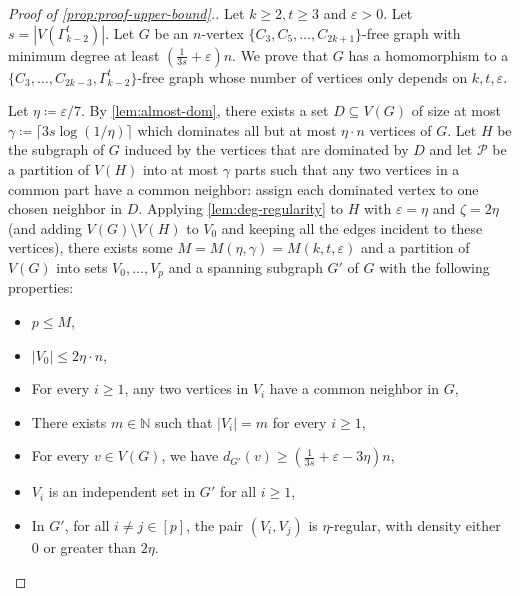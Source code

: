 \documentclass{article}
\begin{document}
\begin{proof}[Proof of \cref{prop:proof-upper-bound}.]
    Let $k \geq 2, t \geq 3$ and $\varepsilon > 0$.
    Let $s = |V(\Gamma_{k-2}^t)|$.
    Let $G$ be an $n$-vertex $\{C_3, C_5, \ldots, C_{2k+1}\}$-free graph with minimum degree at least $\left(\frac{1}{3s}+\varepsilon\right)n$.
    We prove that $G$ has a homomorphism to a $\{C_3, \ldots, C_{2k-3}, \Gamma_{k-2}^t\}$-free graph whose number of vertices only depends on $k, t, \varepsilon$.
    
    Let $\eta \coloneqq \varepsilon/7$.
    By \cref{lem:almost-dom}, there exists a set $D \subseteq V(G)$ of size at most $\gamma \coloneqq \lceil3s\log(1/\eta)\rceil$ which dominates all but at most $\eta \cdot n$ vertices of $G$.
    Let $H$ be the subgraph of $G$ induced by the vertices that are dominated by $D$ and let $\mathcal{P}$ be a partition of $V(H)$ into at most $\gamma$ parts such that any two vertices in a common part have a common neighbor: assign each dominated vertex to one chosen neighbor in $D$.
    Applying \cref{lem:deg-regularity} to $H$ with $\varepsilon = \eta$ and $\zeta = 2\eta$ (and adding $V(G) \setminus V(H)$ to $V_0$ and keeping all the edges incident to these vertices), there exists some $M=M(\eta,\gamma) = M(k, t, \varepsilon)$ and a partition of $V(G)$ into sets $V_0, \ldots, V_p$ and a spanning subgraph $G'$ of $G$ with the following properties: \begin{itemize}
        \item $p \leq M$, 
        \item $|V_0| \leq 2\eta \cdot n$,
        \item For every $i \geq 1$, any two vertices in $V_i$ have a common neighbor in $G$,
        \item There exists $m \in \mathbb{N}$ such that $|V_i| = m$ for every $i \geq 1$,
        \item For every $v \in V(G)$, we have $d_{G'}(v) \geq \left(\frac{1}{3s}+\varepsilon-3\eta\right)n$,
        \item $V_i$ is an independent set in $G'$ for all $i \geq 1$, 
        \item In $G'$, for all $i \neq j \in [p]$, the pair $(V_i, V_j)$ is $\eta$-regular, with density either $0$ or greater than $2\eta$.
    \end{itemize}


\end{proof}
\end{document}
